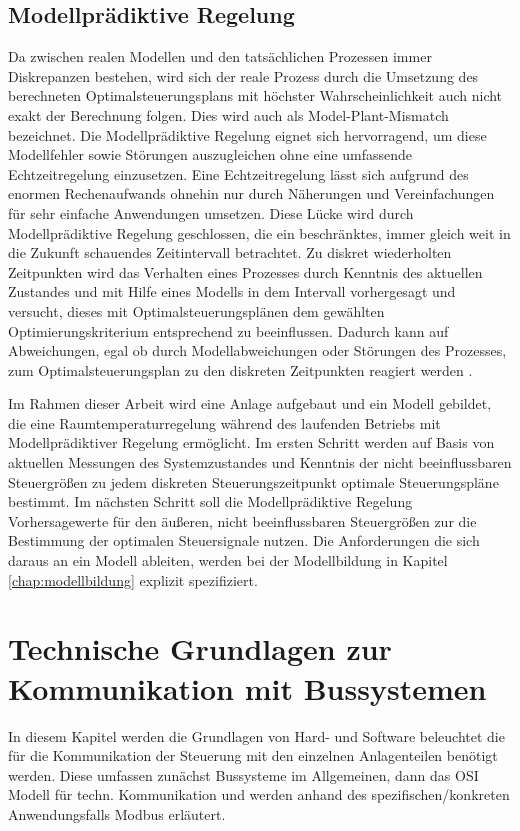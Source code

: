 
\subsection{Modellprädiktive Regelung}

Da zwischen realen Modellen und den tatsächlichen Prozessen immer Diskrepanzen bestehen, wird sich der reale Prozess durch die Umsetzung des berechneten Optimalsteuerungsplans mit höchster Wahrscheinlichkeit auch nicht exakt der Berechnung folgen. Dies wird auch als Model-Plant-Mismatch bezeichnet. Die Modellprädiktive Regelung eignet sich hervorragend, um diese Modellfehler sowie Störungen auszugleichen ohne eine umfassende Echtzeitregelung einzusetzen. Eine Echtzeitregelung lässt sich aufgrund des enormen Rechenaufwands ohnehin nur durch Näherungen und Vereinfachungen für sehr einfache Anwendungen umsetzen. Diese Lücke wird durch Modellprädiktive Regelung geschlossen, die ein beschränktes, immer gleich weit in die Zukunft schauendes Zeitintervall betrachtet. Zu diskret wiederholten Zeitpunkten wird das Verhalten eines Prozesses durch Kenntnis des aktuellen Zustandes und mit Hilfe eines Modells in dem Intervall vorhergesagt und versucht, dieses mit Optimalsteuerungsplänen dem gewählten Optimierungskriterium entsprechend zu beeinflussen. Dadurch kann auf Abweichungen, egal ob durch Modellabweichungen oder Störungen des Prozesses, zum Optimalsteuerungsplan zu den diskreten Zeitpunkten reagiert werden \cite[S.~71]{di14}.

Im Rahmen dieser Arbeit wird eine Anlage aufgebaut und ein Modell gebildet, die eine Raumtemperaturregelung während des laufenden Betriebs mit Modellprädiktiver Regelung ermöglicht. Im ersten Schritt werden auf Basis von aktuellen Messungen des Systemzustandes und Kenntnis der nicht beeinflussbaren Steuergrößen zu jedem diskreten Steuerungszeitpunkt optimale Steuerungspläne bestimmt. Im nächsten Schritt soll die Modellprädiktive Regelung Vorhersagewerte für den äußeren, nicht beeinflussbaren Steuergrößen zur die Bestimmung der optimalen Steuersignale nutzen.
Die Anforderungen die sich daraus an ein Modell ableiten, werden bei der Modellbildung in Kapitel \ref{chap:modellbildung} explizit spezifiziert.

\section{Technische Grundlagen zur Kommunikation mit Bussystemen}
\label{sec:grundlagenbus}
In diesem Kapitel werden die Grundlagen von Hard- und Software beleuchtet die für die Kommunikation der Steuerung mit den einzelnen Anlagenteilen benötigt werden.
Diese umfassen zunächst Bussysteme im Allgemeinen, dann das OSI Modell für techn. Kommunikation und werden anhand des spezifischen/konkreten Anwendungsfalls Modbus erläutert.


